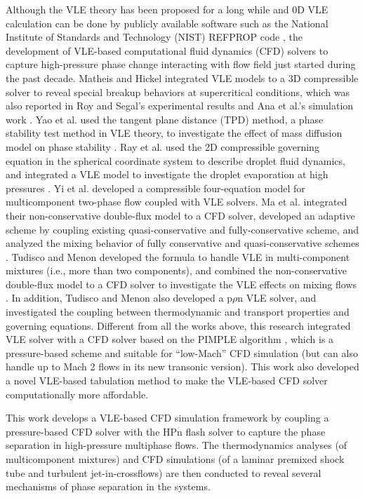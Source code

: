Although the VLE theory has been proposed for a long while \cite{hanks1971calculation} and 0D VLE calculation can be done by publicly available software such as the National Institute of Standards and Technology (NIST) REFPROP code \cite{lemmon2018nist}, the development of VLE-based computational fluid dynamics (CFD) solvers to capture high-pressure phase change interacting with flow field just started during the past decade. Matheis and Hickel \cite{matheis2018multi} integrated VLE models to a 3D compressible solver to reveal special breakup behaviors at supercritical conditions, which was also reported in Roy and Segal's experimental results \citep{roy2010experimental} and Ana et al.'s simulation work \citep{star2006numerical}. Yao et al. used the tangent plane distance (TPD) method, a phase stability test method in VLE theory, to investigate the effect of mass diffusion model on phase stability \citep{yao2019molecular}. Ray et al. used the 2D compressible governing equation in the spherical coordinate system to describe droplet fluid dynamics, and integrated a VLE model to investigate the droplet evaporation at high pressures \cite{ray2019two}. Yi et al. developed a compressible four-equation model for multicomponent two-phase flow coupled with VLE solvers. Ma et al. integrated their non-conservative double-flux model \cite{ma2017entropy} to a CFD solver, developed an adaptive scheme by coupling existing quasi-conservative and fully-conservative scheme, and analyzed the mixing behavior of fully conservative and quasi-conservative schemes \citep{ma2019numerical}. Tudisco and Menon developed the formula to handle VLE in multi-component mixtures (i.e., more than two components), and combined the non-conservative double-flux model \cite{ma2017entropy} to a CFD solver to investigate the VLE effects on mixing flows \cite{tudisco2020numerical}. In addition, Tudisco and Menon \cite{tudisco2020vapor} also developed a p$\rho$n VLE solver, and investigated the coupling between thermodynamic and transport properties and governing equations. Different from all the works above, this research integrated VLE solver with a CFD solver based on the PIMPLE algorithm \cite{holzmann2016mathematics}, which is a pressure-based scheme and suitable for ``low-Mach'' CFD simulation (but can also handle up to Mach 2 flows in its new transonic version). This work also developed a novel VLE-based tabulation method to make the VLE-based CFD solver computationally more affordable. 

This work develops a VLE-based CFD simulation framework by coupling a pressure-based CFD solver with the HPn flash solver to capture the phase separation in high-pressure multiphase flows. The thermodynamics analyses (of multicomponent mixtures) and CFD simulations (of a laminar premixed shock tube and turbulent jet-in-crossflows) are then conducted to reveal several mechanisms of phase separation in the  systems.

